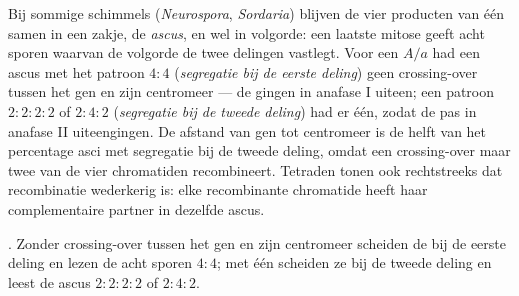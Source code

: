 \begin{proposition}[Tetradenanalyse]\label{prop:b2:meiosis-heredity:tetrads}
Bij sommige schimmels (\emph{Neurospora}, \emph{Sordaria}) blijven de
vier producten van één  samen in een zakje, de \emph{ascus}, en wel
in volgorde: een laatste mitose geeft acht sporen waarvan de volgorde de
twee delingen vastlegt. Voor een  $A/a$ had een ascus met het
patroon $4 : 4$ (\emph{segregatie bij de eerste deling}) geen
crossing-over tussen het gen en zijn centromeer --- de  gingen in
anafase I uiteen; een patroon $2 : 2 : 2 : 2$ of $2 : 4 : 2$
(\emph{segregatie bij de tweede deling}) had er één, zodat de  pas
in anafase II uiteengingen. De afstand van gen tot centromeer is de helft
van het percentage asci met segregatie bij de tweede deling, omdat een
crossing-over maar twee van de vier chromatiden recombineert. Tetraden
tonen ook rechtstreeks dat recombinatie wederkerig is: elke recombinante
chromatide heeft haar complementaire partner in dezelfde ascus.
\end{proposition}

\begin{omfigure}

{\small {}. Zonder crossing-over tussen het gen en zijn
centromeer scheiden de  bij de eerste deling en lezen de acht
sporen $4 : 4$; met één scheiden ze bij de tweede deling en leest de
ascus $2 : 2 : 2 : 2$ of $2 : 4 : 2$.}
\end{omfigure}

